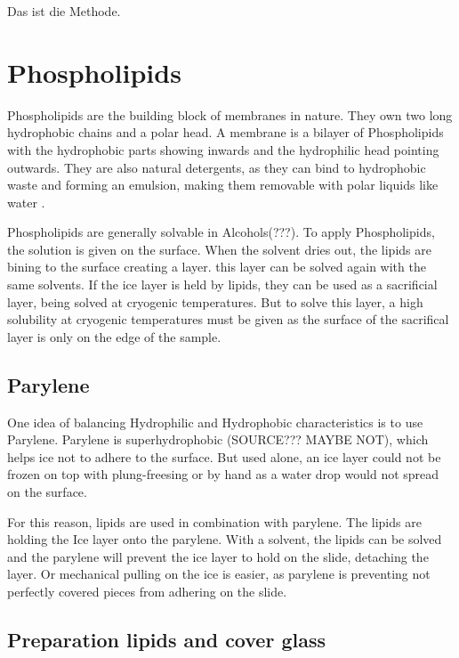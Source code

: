 
Das ist die Methode.

\section{Phospholipids}
\label{section:metodeLipide}

Phospholipids are the building block of membranes in nature. They own two long hydrophobic chains and a polar head. A membrane is a bilayer of Phospholipids with the hydrophobic parts showing inwards and the hydrophilic head pointing outwards. They are also natural detergents, as they can bind to hydrophobic waste and forming an emulsion, making them removable with polar liquids like water \cite{SriramaM.BhairiPh.D..}.

Phospholipids are generally solvable in Alcohols(???). To apply Phospholipids, the solution is given on the surface. When the solvent dries out, the lipids are bining to the surface creating a layer. this layer can be solved again with the same solvents. If the ice layer is held by lipids, they can be used as a sacrificial layer, being solved at cryogenic temperatures. But to solve this layer, a high solubility at cryogenic temperatures must be given as the surface of the sacrifical layer is only on the edge of the sample.

\subsection{Parylene}

One idea of balancing Hydrophilic and Hydrophobic characteristics is to use Parylene. Parylene is superhydrophobic (SOURCE??? MAYBE NOT), which helps ice not to adhere to the surface. But used alone, an ice layer could not be frozen on top with plung-freesing or by hand as a water drop would not spread on the surface. 

For this reason, lipids are used in combination with parylene. The lipids are holding the Ice layer onto the parylene. With a solvent, the lipids can be solved and the parylene will prevent the ice layer to hold on the slide, detaching the layer. Or mechanical pulling on the ice is easier, as parylene is preventing not perfectly covered pieces from adhering on the slide.

\subsection{Preparation lipids and cover glass}

